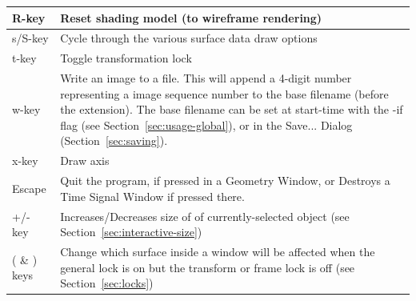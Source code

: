 \begin{table}[htbp]
\begin{center}
\begin{tabular}{|l|p{6in}|}
        R-key   &       Reset shading model (to wireframe rendering) \\ \hline
        s/S-key   &      Cycle through the various surface data draw 
        options \\ \hline
        t-key   &       Toggle transformation lock \\ \hline
        w-key   &       Write an image to a file.  This will append a 4-digit 
                        number representing a image sequence number to the 
                        base filename (before the extension).  The base 
                        filename can be set at start-time with the -if flag 
                        (see Section~\ref{sec:usage-global}), or in the 
                        Save... Dialog (Section~\ref{sec:saving}).  \\ \hline
        x-key   &       Draw axis \\ \hline
        Escape  &       Quit the program, if pressed in a Geometry Window, 
            or Destroys a Time Signal Window if pressed there. \\ \hline
        +/- key   &    Increases/Decreases size of of currently-selected object
       (see Section~\ref{sec:interactive-size})\\ \hline
       ( \& ) keys   &  Change which surface inside a window will be affected
            when the general lock is on but the transform or frame lock is off
            (see Section~\ref{sec:locks})\\ \hline
\end{tabular}
\end{center}

\end{table} 

